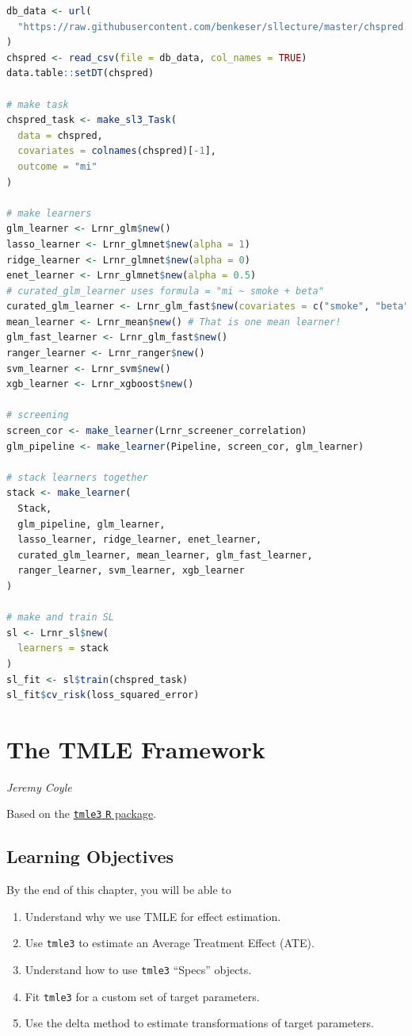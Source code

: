 \documentclass[
  12pt, krantz2,
]{krantz}
\newcommand{\passthrough}[1]{#1}
\providecommand{\tightlist}{%
  \setlength{\itemsep}{0pt}\setlength{\parskip}{0pt}}
\newcommand{\1}{\mathbbm{1}}
\theoremstyle{definition}
\theoremstyle{definition}
\theoremstyle{definition}
\theoremstyle{definition}
\theoremstyle{remark}
\begin{document}
\begin{lstlisting}[language=R]
db_data <- url(
  "https://raw.githubusercontent.com/benkeser/sllecture/master/chspred.csv"
)
chspred <- read_csv(file = db_data, col_names = TRUE)
data.table::setDT(chspred)

# make task
chspred_task <- make_sl3_Task(
  data = chspred,
  covariates = colnames(chspred)[-1],
  outcome = "mi"
)

# make learners
glm_learner <- Lrnr_glm$new()
lasso_learner <- Lrnr_glmnet$new(alpha = 1)
ridge_learner <- Lrnr_glmnet$new(alpha = 0)
enet_learner <- Lrnr_glmnet$new(alpha = 0.5)
# curated_glm_learner uses formula = "mi ~ smoke + beta"
curated_glm_learner <- Lrnr_glm_fast$new(covariates = c("smoke", "beta"))
mean_learner <- Lrnr_mean$new() # That is one mean learner!
glm_fast_learner <- Lrnr_glm_fast$new()
ranger_learner <- Lrnr_ranger$new()
svm_learner <- Lrnr_svm$new()
xgb_learner <- Lrnr_xgboost$new()

# screening
screen_cor <- make_learner(Lrnr_screener_correlation)
glm_pipeline <- make_learner(Pipeline, screen_cor, glm_learner)

# stack learners together
stack <- make_learner(
  Stack,
  glm_pipeline, glm_learner,
  lasso_learner, ridge_learner, enet_learner,
  curated_glm_learner, mean_learner, glm_fast_learner,
  ranger_learner, svm_learner, xgb_learner
)

# make and train SL
sl <- Lrnr_sl$new(
  learners = stack
)
sl_fit <- sl$train(chspred_task)
sl_fit$cv_risk(loss_squared_error)
\end{lstlisting}

\hypertarget{tmle3}{%
\chapter{The TMLE Framework}\label{tmle3}}

\emph{Jeremy Coyle}

Based on the \href{https://github.com/tlverse/tmle3}{\passthrough{\lstinline!tmle3!} \passthrough{\lstinline!R!} package}.

\hypertarget{learn-tmle}{%
\section{Learning Objectives}\label{learn-tmle}}

By the end of this chapter, you will be able to

\begin{enumerate}
\def\labelenumi{\arabic{enumi}.}
\tightlist
\item
  Understand why we use TMLE for effect estimation.
\item
  Use \passthrough{\lstinline!tmle3!} to estimate an Average Treatment Effect (ATE).
\item
  Understand how to use \passthrough{\lstinline!tmle3!} ``Specs'' objects.
\item
  Fit \passthrough{\lstinline!tmle3!} for a custom set of target parameters.
\item
  Use the delta method to estimate transformations of target parameters.
\end{enumerate}
\end{document}
